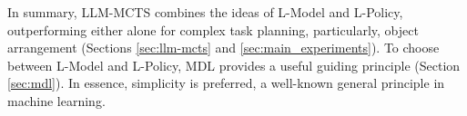 In summary,  LLM-MCTS combines the ideas of L-Model and L-Policy,
outperforming either alone for complex task planning, particularly, object
arrangement (Sections \ref{sec:llm-mcts} and \ref{sec:main_experiments}).  To
choose between L-Model and L-Policy, MDL provides a useful guiding principle
(Section \ref{sec:mdl}). In essence, simplicity is preferred, a well-known
general principle in machine learning.






